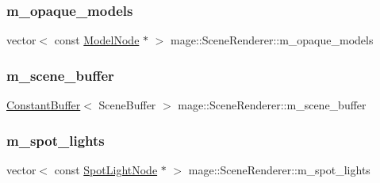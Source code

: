 \hypertarget{classmage_1_1_scene_renderer_a9a863c542b4a6e4467b244fb7632fefd}{}\label{classmage_1_1_scene_renderer_a9a863c542b4a6e4467b244fb7632fefd} 
\subsubsection{\texorpdfstring{m\+\_\+opaque\+\_\+models}{m\_opaque\_models}}
{\footnotesize\ttfamily vector$<$ const \hyperlink{classmage_1_1_model_node}{Model\+Node} $\ast$ $>$ mage\+::\+Scene\+Renderer\+::m\+\_\+opaque\+\_\+models\hspace{0.3cm}{\ttfamily [private]}}

\hypertarget{classmage_1_1_scene_renderer_a7d52aefd61cffc02689519c36ac00b3c}{}\label{classmage_1_1_scene_renderer_a7d52aefd61cffc02689519c36ac00b3c} 
\subsubsection{\texorpdfstring{m\+\_\+scene\+\_\+buffer}{m\_scene\_buffer}}
{\footnotesize\ttfamily \hyperlink{structmage_1_1_constant_buffer}{Constant\+Buffer}$<$ Scene\+Buffer $>$ mage\+::\+Scene\+Renderer\+::m\+\_\+scene\+\_\+buffer\hspace{0.3cm}{\ttfamily [private]}}

\hypertarget{classmage_1_1_scene_renderer_a227753ffa4f341546b4bd7d3fc82b1eb}{}\label{classmage_1_1_scene_renderer_a227753ffa4f341546b4bd7d3fc82b1eb} 
\subsubsection{\texorpdfstring{m\+\_\+spot\+\_\+lights}{m\_spot\_lights}}
{\footnotesize\ttfamily vector$<$ const \hyperlink{namespacemage_aeed5dee4ff6c591eabb0e9114256df4a}{Spot\+Light\+Node} $\ast$ $>$ mage\+::\+Scene\+Renderer\+::m\+\_\+spot\+\_\+lights\hspace{0.3cm}{\ttfamily [private]}}

